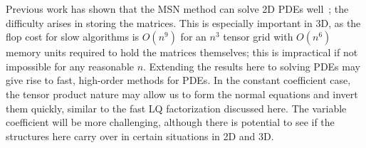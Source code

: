 Previous work has shown that the MSN method can solve 2D PDEs
well~\cite{msnPDE}; the difficulty arises in storing the matrices.
This is especially important in 3D, as the flop cost for slow
algorithms is $O(n^{9})$ for an $n^{3}$ tensor grid with
$O(n^{6})$ memory units required to hold the matrices themselves;
this is impractical if not impossible for any reasonable $n$.
Extending the results here to solving PDEs may give rise to fast,
high-order methods for PDEs.
In the constant coefficient case, the tensor product nature
may allow us to form the normal equations and invert them quickly,
similar to the fast LQ factorization discussed here.
The variable coefficient will be more challenging, although
there is potential to see if the structures here
carry over in certain situations in 2D and 3D.
